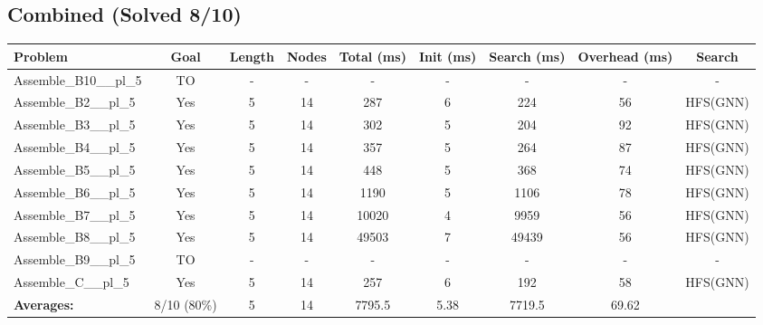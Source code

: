 \documentclass{article}
\begin{document}
\subsection*{Combined (Solved 8/10)}
\begin{tabular}{lcccccccc}
\toprule
Problem & Goal & Length & Nodes & Total (ms) & Init (ms) & Search (ms) & Overhead (ms) & Search \\
\midrule
Assemble\_B10\_\_pl\_5 & TO & - & - & - & - & - & - & - \\
Assemble\_B2\_\_pl\_5 & Yes & 5 & 14 & 287 & 6 & 224 & 56 & HFS(GNN) \\
Assemble\_B3\_\_pl\_5 & Yes & 5 & 14 & 302 & 5 & 204 & 92 & HFS(GNN) \\
Assemble\_B4\_\_pl\_5 & Yes & 5 & 14 & 357 & 5 & 264 & 87 & HFS(GNN) \\
Assemble\_B5\_\_pl\_5 & Yes & 5 & 14 & 448 & 5 & 368 & 74 & HFS(GNN) \\
Assemble\_B6\_\_pl\_5 & Yes & 5 & 14 & 1190 & 5 & 1106 & 78 & HFS(GNN) \\
Assemble\_B7\_\_pl\_5 & Yes & 5 & 14 & 10020 & 4 & 9959 & 56 & HFS(GNN) \\
Assemble\_B8\_\_pl\_5 & Yes & 5 & 14 & 49503 & 7 & 49439 & 56 & HFS(GNN) \\
Assemble\_B9\_\_pl\_5 & TO & - & - & - & - & - & - & - \\
Assemble\_C\_\_pl\_5 & Yes & 5 & 14 & 257 & 6 & 192 & 58 & HFS(GNN) \\
\textbf{Averages:} & 8/10 (80\%) & 5 & 14 & 7795.5 & 5.38 & 7719.5 & 69.62 & \\
\bottomrule
\end{tabular}
\\[0.7cm]
\end{document}
